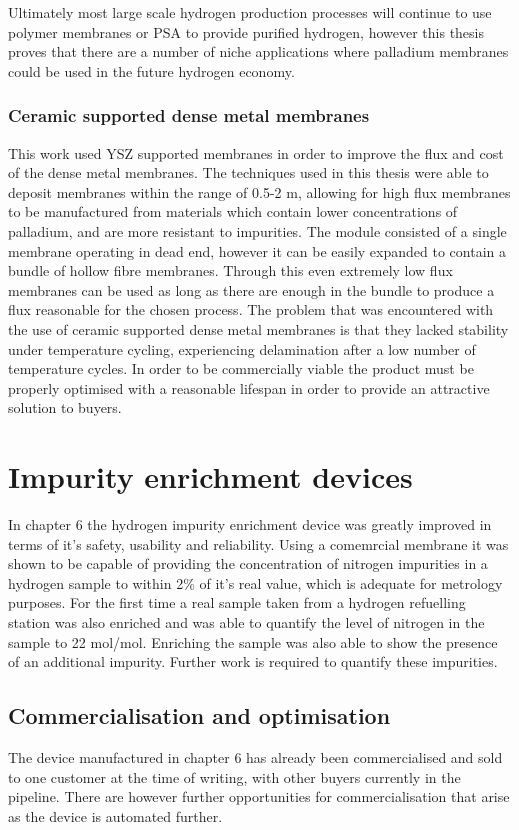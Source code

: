 Ultimately most large scale hydrogen production processes will continue to use polymer membranes or PSA to provide purified hydrogen, however this thesis proves that there are a number of niche applications where palladium membranes could be used in the future hydrogen economy. 

\subsubsection*{Ceramic supported dense metal membranes}
This work used YSZ supported membranes in order to improve the flux and cost of the dense metal membranes. The techniques used in this thesis were able to deposit membranes within the range of 0.5-2 \textmu m, allowing for high flux membranes to be manufactured from materials which contain lower concentrations of palladium, and are more resistant to impurities. The module consisted of a single membrane operating in dead end, however it can be easily expanded to contain a bundle of hollow fibre membranes. Through this even extremely low flux membranes can be used as long as there are enough in the bundle to produce a flux reasonable for the chosen process. The problem that was encountered with the use of ceramic supported dense metal membranes is that they lacked stability under temperature cycling, experiencing delamination after a low number of temperature cycles. In order to be commercially viable the product must be properly optimised with a reasonable lifespan in order to provide an attractive solution to buyers. 

\section{Impurity enrichment devices}
In chapter 6 the hydrogen impurity enrichment device was greatly improved in terms of it's safety, usability and reliability. Using a comemrcial membrane it was shown to be capable of providing the concentration of nitrogen impurities in a hydrogen sample to within 2\% of it's real value, which is adequate for metrology purposes. \cite{Murugan2015} For the first time a real sample taken from a hydrogen refuelling station was also enriched and was able to quantify the level of nitrogen in the sample to 22 \textmu mol/mol. Enriching the sample was also able to show the presence of an additional impurity. Further work is required to quantify these impurities. 

\subsection{Commercialisation and optimisation}
The device manufactured in chapter 6 has already been commercialised and sold to one customer at the time of writing, with other buyers currently in the pipeline. There are however further opportunities for commercialisation that arise as the device is automated further. 

